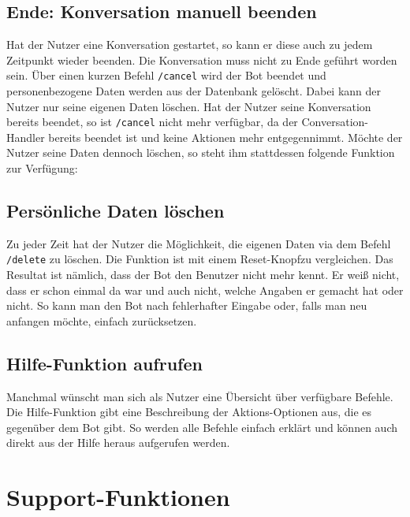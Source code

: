            \subsection{Ende: Konversation manuell beenden}
            Hat der Nutzer eine Konversation gestartet, so kann er diese auch zu jedem Zeitpunkt wieder beenden. Die Konversation muss nicht zu Ende geführt worden sein. Über einen kurzen Befehl \verb|/cancel| wird der Bot beendet und personenbezogene Daten werden aus der Datenbank gelöscht. Dabei kann der Nutzer nur seine eigenen Daten löschen. Hat der Nutzer seine Konversation bereits beendet, so ist \verb|/cancel| nicht mehr verfügbar, da der Conversation-Handler bereits beendet ist und keine Aktionen mehr entgegennimmt. Möchte der Nutzer seine Daten dennoch löschen, so steht ihm stattdessen folgende Funktion zur Verfügung: 
            
            \subsection{Persönliche Daten löschen}
            Zu jeder Zeit hat der Nutzer die Möglichkeit, die eigenen Daten via dem Befehl \verb|/delete| zu löschen. Die Funktion ist mit einem \glqq Reset-Knopf\grqq  zu vergleichen. Das Resultat ist nämlich, dass der Bot den Benutzer nicht mehr kennt. Er weiß nicht, dass er schon einmal da war und auch nicht, welche Angaben er gemacht hat oder nicht. So kann man den Bot nach fehlerhafter Eingabe oder, falls man neu anfangen möchte, einfach zurücksetzen.
            
            \subsection{Hilfe-Funktion aufrufen}
            Manchmal wünscht man sich als Nutzer eine Übersicht über verfügbare Befehle. Die Hilfe-Funktion gibt eine Beschreibung der Aktions-Optionen aus, die es gegenüber dem Bot gibt. So werden alle Befehle einfach erklärt und können auch direkt aus der Hilfe heraus aufgerufen werden.             


    \section{Support-Funktionen}
        
